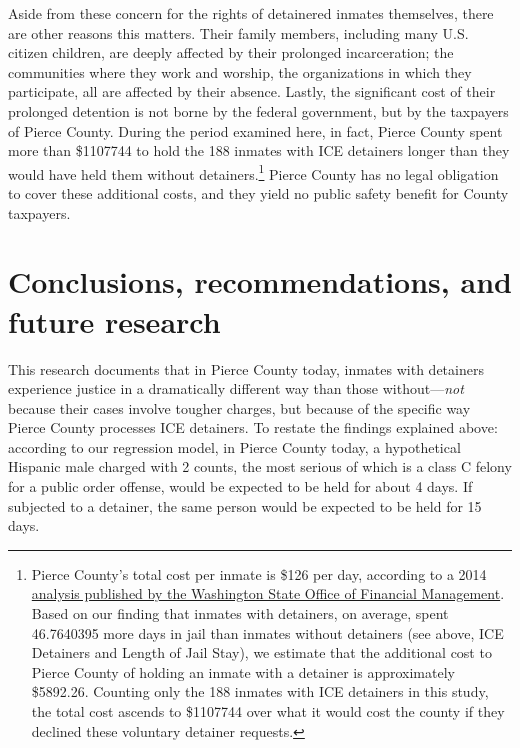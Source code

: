 \documentclass[12pt]{report}\usepackage[]{graphicx}\usepackage[]{color}
\begin{document}
Aside from these concern for the rights of detainered inmates themselves, there are other reasons this matters. Their family members, including many U.S. citizen children, are deeply affected by their prolonged incarceration; the communities where they work and worship, the organizations in which they participate, all are affected by their absence. Lastly, the significant cost of their prolonged detention is not borne by the federal government, but by the taxpayers of Pierce County. During the period examined here, in fact, Pierce County spent more than \$\num[round-precision=2,round-mode=places,round-integer-to-decimal, ]{1107744} to hold the 188 inmates with ICE detainers longer than they would have held them without detainers.\footnote{Pierce County's total cost per inmate is \$\num{126} per day, according to a 2014 \href{<https://ofm.wa.gov/sites/default/files/public/legacy/reports/Correctional_Needs_and_Costs_Study2014.pdf>}{analysis published by the Washington State Office of Financial Management}. Based on our finding that inmates with detainers, on average, spent \num{46.7640395} more days in jail than inmates without detainers (see above, ICE Detainers and Length of Jail Stay), we estimate that the additional cost to Pierce County of holding an inmate with a detainer is approximately \$\num[round-precision=2,round-mode=places,round-integer-to-decimal]{5892.26}. Counting only the 188 inmates with ICE detainers in this study, the total cost ascends to \$\num[round-precision=2,round-mode=places,round-integer-to-decimal]{1107744} over what it would cost the county if they declined these voluntary detainer requests.} Pierce County has no legal obligation to cover these additional costs, and they yield no public safety benefit for County taxpayers.

\section*{Conclusions, recommendations, and future research}

This research documents that in Pierce County today, inmates with detainers experience justice in a dramatically different way than those without---\emph{not} because their cases involve tougher charges, but because of the specific way Pierce County processes ICE detainers. To restate the findings explained above: according to our regression model, in Pierce County today, a hypothetical Hispanic male charged with 2 counts, the most serious of which is a class C felony for a public order offense, would be expected to be held for about 4 days. If subjected to a detainer, the same person would be expected to be held for 15 days.
\end{document}
